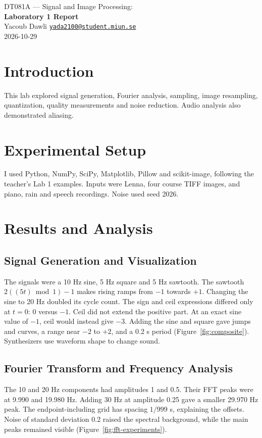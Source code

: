 \documentclass[11pt,a4paper]{article}
\begin{document}
\fontsize{10}{12}\selectfont
\begin{center}
{\large DT081A --- Signal and Image Processing:}\\[2pt]
{\Large\bfseries Laboratory 1 Report}\\[3pt]
Yacoub Dawli \quad \href{mailto:yada2100@student.miun.se}{\texttt{yada2100@student.miun.se}}\\[2pt]
2026-10-29
\end{center}
\vspace{-5pt}

\section{Introduction}
This lab explored signal generation, Fourier analysis, sampling, image
resampling, quantization, quality measurements and noise reduction. Audio
analysis also demonstrated aliasing.

\section{Experimental Setup}
I used Python, NumPy, SciPy, Matplotlib, Pillow and scikit-image, following the
teacher's Lab 1 examples. Inputs were Lenna, four course TIFF images, and piano,
rain and speech recordings. Noise used seed 2026.

\section{Results and Analysis}
\subsection{Signal Generation and Visualization}
The signals were a 10 Hz sine, 5 Hz square and 5 Hz sawtooth.
The sawtooth \(2((5t)\bmod 1)-1\) makes rising ramps from \(-1\) towards \(+1\).
Changing the sine to 20 Hz doubled its cycle count.
The sign and ceil expressions differed only at \(t=0\): 0 versus \(-1\).
Ceil did not extend the positive part.
At an exact sine value of \(-1\), ceil would instead give \(-3\).
Adding the sine and square gave jumps and curves, a range near \(-2\) to \(+2\),
and a 0.2 s period (Figure~\ref{fig:composite}). Synthesizers use waveform shape to change sound.

\subsection{Fourier Transform and Frequency Analysis}
The 10 and 20 Hz components had amplitudes 1 and 0.5. Their FFT peaks were at
9.990 and 19.980 Hz. Adding 30 Hz at amplitude 0.25 gave a smaller
29.970 Hz peak. The endpoint-including grid has spacing \(1/999\) s, explaining
the offsets. Noise of standard deviation 0.2 raised
the spectral background, while the main peaks remained visible
(Figure~\ref{fig:fft-experiments}).
\end{document}
